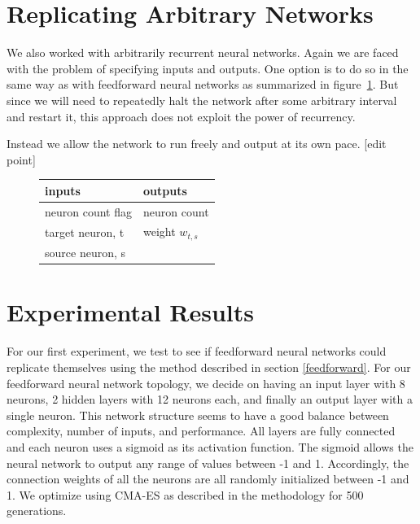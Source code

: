 \documentclass[12pt]{article}
\begin{document}
\section{Replicating Arbitrary Networks}
\label{arbitrary}

We also worked with arbitrarily recurrent neural networks.
Again we are faced with the problem
of specifying inputs and outputs.
One option is to do so in the same way
as with feedforward neural networks
as summarized in figure~\ref{arbitrarybadio}.
But since we will need
to repeatedly halt the network
after some arbitrary interval
and restart it,
this approach does not exploit
the power of recurrency.

Instead we allow the network to run freely
and output at its own pace.
[edit point]

\begin{figure}[h]
  \centering
  \begin{tabular}{ll}
  \toprule
  inputs            & outputs \\
  \midrule
  neuron count flag & neuron count \\
  target neuron, t  & weight $w_{t,s}$ \\
  source neuron, s  & \\
  \bottomrule
  \end{tabular}
  \caption{}
  \label{arbitrarybadio}
\end{figure}

\section{Experimental Results}
\label{results}

For our first experiment,
we test to see if feedforward neural networks
could replicate themselves using the method described
in section \ref{feedforward}.
For our feedforward neural network topology,
we decide on having an input layer with 8 neurons,
2 hidden layers with 12 neurons each,
and finally an output layer with a single neuron.
This network structure seems to have a good balance
between complexity, number of inputs, and performance.
All layers are fully connected
and each neuron uses a sigmoid
as its activation function.
The sigmoid allows the neural network
to output any range of values between -1 and 1.
Accordingly, the connection weights
of all the neurons are all randomly initialized between -1 and 1.
We optimize using CMA-ES
as described in the methodology for 500 generations.
\end{document}
